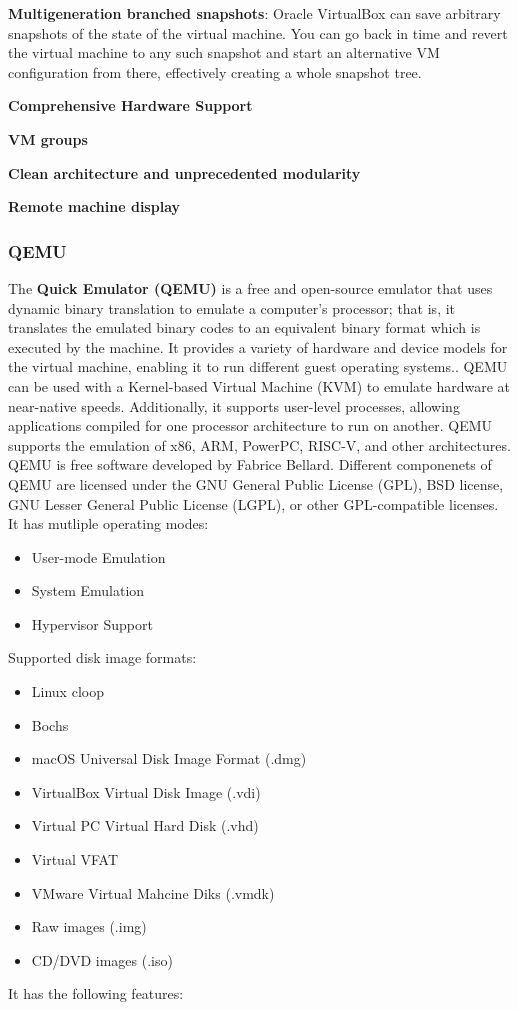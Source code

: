 \documentclass[a4paper,12pt]{report}
\begin{document}
\textbf{Multigeneration branched snapshots}: Oracle VirtualBox can save arbitrary snapshots of the state of the virtual machine. You can go back in time and revert the virtual machine to any such snapshot and start an alternative VM configuration from there, effectively creating a whole snapshot tree.


\textbf{Comprehensive Hardware Support}


\textbf{VM groups}


\textbf{Clean architecture and unprecedented modularity}

\textbf{Remote machine display}
\newpage

\subsubsection{QEMU}
The \textbf{Quick Emulator (QEMU)} is a free and open-source emulator that uses dynamic binary translation to emulate a computer's processor;
 that is, it translates the emulated binary codes to an equivalent 
binary format which is executed by the machine. It provides a variety of hardware and device models for the virtual machine, enabling it to run different guest operating systems.. QEMU can be used with a Kernel-based Virtual Machine (KVM) to emulate hardware at near-native speeds. Additionally, it supports user-level processes, allowing applications compiled for one processor architecture to run on another.
\newline
QEMU supports the emulation of x86, ARM, PowerPC, RISC-V, and other architectures.
\newline
QEMU is free software developed by Fabrice Bellard. Different componenets of QEMU are licensed under the GNU General Public License (GPL), BSD license, GNU Lesser General Public License (LGPL), or other GPL-compatible licenses.
\newline
It has mutliple operating modes:

\begin{itemize}
    \item User-mode Emulation
    \item System Emulation
    \item Hypervisor Support

\end{itemize}
Supported disk image formats:\
\begin{itemize}
    \item Linux cloop
    \item Bochs
    \item macOS Universal Disk Image Format (.dmg)
    \item VirtualBox Virtual Disk Image (.vdi)
    \item Virtual PC Virtual Hard Disk (.vhd)
    \item Virtual VFAT
    \item VMware Virtual Mahcine Diks (.vmdk)
    \item Raw images (.img)
    \item CD/DVD images (.iso)
    
\end{itemize}
It has the following features:
\end{document}
